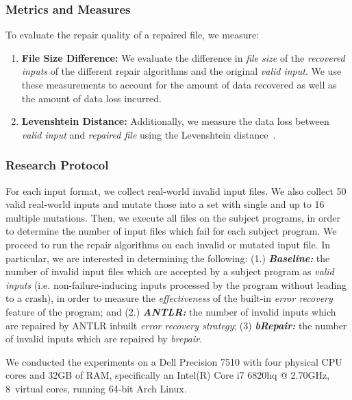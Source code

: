 \documentclass[sigconf,review,anonymous]{acmart}
\newcommand{\brepair}{\textit{brepair}\xspace}
\begin{document}
\subsubsection*{\bf Metrics and Measures}
To evaluate the repair quality of a repaired file, we measure:
\begin{enumerate}
    \item \textbf{File Size Difference: } We evaluate the difference in \textit{file size} of the \emph{recovered inputs} of the different repair algorithms and the original \textit{valid input}.
    We use these measurements to account for the amount of data recovered as well as the amount of data loss incurred.
\item \textbf{Levenshtein Distance: } Additionally, we measure the data loss between \textit{valid input} and \textit{repaired file} using the Levenshtein distance~\cite{levDistance}.
\end{enumerate}

\subsubsection*{\bf Research Protocol}
For each input format, we collect real-world invalid input files.
We also collect 50 valid real-world inputs and mutate those into a set with single and up to 16 multiple mutations.
Then, we execute all files on the subject programs, in order to determine the number of input files which fail for each subject program.
We proceed to run the repair algorithms on each invalid or mutated input file.
In particular, we are interested in determining the following:
(1.) \textit{\textbf{Baseline:}} the number of invalid input files which are accepted by a subject program as \textit{valid inputs} (i.e. non-failure-inducing inputs processed by the program without leading to a crash), in order to measure the \textit{effectiveness} of the built-in \textit{error recovery} feature of the program;  and
(2.) \textit{\textbf{ANTLR:}} the number of invalid inputs which are repaired by ANTLR inbuilt \textit{error recovery strategy};
(3) \textit{\textbf{bRepair:}} the number of invalid inputs which are repaired by \brepair.

We conducted the experiments on a Dell Precision 7510 
with four physical CPU cores %
and 32GB of RAM, specifically an Intel(R) Core i7 6820hq @ 2.70GHz, 8~virtual cores, running 64-bit Arch Linux.
\end{document}
